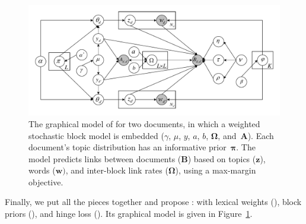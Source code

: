 \begin{figure}[th]
  \centering
  \includegraphics[width=.85\linewidth]{2016_acl_docblock/figures/lex_wsb_rtm.pdf}
  \caption{The graphical model of \lexwsbmedrtm for two documents, in
    which a weighted stochastic block model is embedded ($\gamma$,
    $\mu$, $y$, $a$, $b$, $\bm{\Omega}$, and~$\bm{A}$). Each document's
    topic distribution has an informative prior~$\bm{\pi}$. The model
    predicts links between documents ($\bm{B}$) based on topics
    ($\bm{z}$), words ($\bm{w})$, and inter-block link rates
    ($\bm{\Omega}$), using a max-margin
    objective.}\label{fig:graphical_model}
\end{figure}

Finally, we put all the pieces together and propose \lexwsbmedrtm:
\rtm with lexical weights (\lex), block priors (\wsb), and hinge loss
(\med). Its graphical model is given in
Figure~\ref{fig:graphical_model}.




